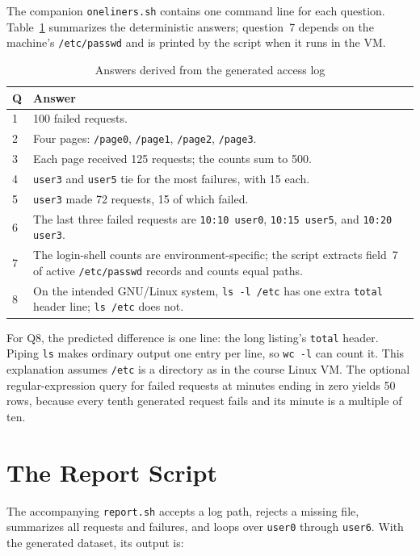 \documentclass[12pt]{article}
\newcommand{\cmd}[1]{\texttt{#1}}
\begin{document}
The companion \cmd{oneliners.sh} contains one command line for each question. Table~\ref{tab:results} summarizes the deterministic answers; question~7 depends on the machine's \cmd{/etc/passwd} and is printed by the script when it runs in the VM.

\begin{table}[H]\centering\small
\caption{Answers derived from the generated access log}\label{tab:results}
\begin{tabular}{p{}p{}}\toprule
\textbf{Q} & \textbf{Answer}\\\midrule
1 & 100 failed requests.\\
2 & Four pages: \cmd{/page0}, \cmd{/page1}, \cmd{/page2}, \cmd{/page3}.\\
3 & Each page received 125 requests; the counts sum to 500.\\
4 & \cmd{user3} and \cmd{user5} tie for the most failures, with 15 each.\\
5 & \cmd{user3} made 72 requests, 15 of which failed.\\
6 & The last three failed requests are \cmd{10:10 user0}, \cmd{10:15 user5}, and \cmd{10:20 user3}.\\
7 & The login-shell counts are environment-specific; the script extracts field~7 of active \cmd{/etc/passwd} records and counts equal paths.\\
8 & On the intended GNU/Linux system, \cmd{ls -l /etc} has one extra \cmd{total} header line; \cmd{ls /etc} does not.\\
\bottomrule\end{tabular}\end{table}

For Q8, the predicted difference is one line: the long listing's \cmd{total} header. Piping \cmd{ls} makes ordinary output one entry per line, so \cmd{wc -l} can count it. This explanation assumes \cmd{/etc} is a directory as in the course Linux VM. The optional regular-expression query for failed requests at minutes ending in zero yields 50 rows, because every tenth generated request fails and its minute is a multiple of ten.

\section{The Report Script}
The accompanying \cmd{report.sh} accepts a log path, rejects a missing file, summarizes all requests and failures, and loops over \cmd{user0} through \cmd{user6}. With the generated dataset, its output is:
\end{document}
